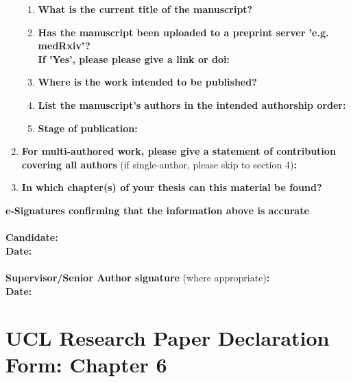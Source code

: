 \begin{enumerate}
        \begin{enumerate}\itemsep0em
            \item \textbf{What is the current title of the manuscript?}
            \item \textbf{Has the manuscript been uploaded to a preprint server 'e.g. medRxiv'? 
            \\
            If 'Yes', please please give a link or doi:}
            \item \textbf{Where is the work intended to be published?}
            \item \textbf{List the manuscript's authors in the intended authorship order:}
            \item \textbf{Stage of publication:}
        \end{enumerate}
        
        \item \textbf{For multi-authored work, please give a statement of contribution covering all authors} (if single-author, please skip to section 4)\textbf{:}
        \item \textbf{In which chapter(s) of your thesis can this material be found?}
    \end{enumerate}
    
    \textbf{e-Signatures confirming that the information above is accurate}\\
    \textbf{}\\ 
    \textbf{Candidate:}\\
    \textbf{Date:}\\
    \textbf{}\\
    \textbf{Supervisor/Senior Author signature} (where appropriate)\textbf{:}\\
    \textbf{Date:}	


\newpage	
\section*{UCL Research Paper Declaration Form: Chapter 6}

